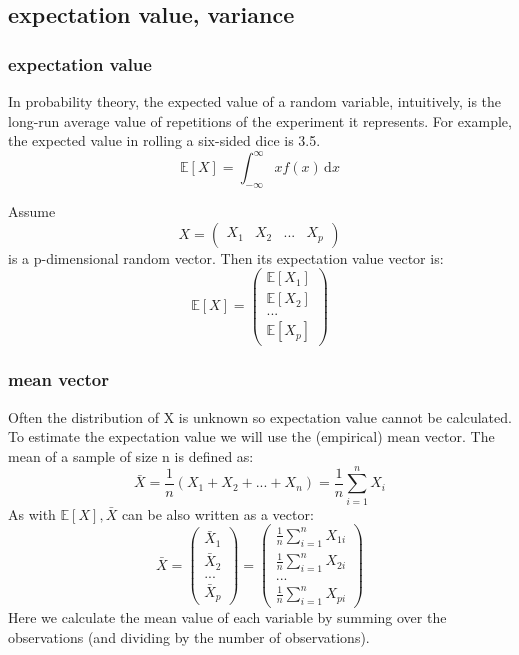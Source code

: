 \documentclass{beamer}
\begin{document}
\subsection{expectation value, variance}

\begin{frame}
\frametitle{expectation value}
In probability theory, the expected value of a random variable, intuitively, is the long-run average value of repetitions of the experiment it represents. 
\newline
For example, the expected value in rolling a six-sided dice is 3.5.
\newline
$$
\mathbb{E}[X] = \int_{-\infty}^{\infty} \! x f(x) \, \mathrm{d}x
$$

Assume $$X= 
\begin{pmatrix}
X_{1} & X_{2} & ... & X_{p}
\end{pmatrix}
$$
is a p-dimensional random vector. 
\newline 
Then its expectation value vector is:
$$
\mathbb{E}[X] =
\begin{pmatrix}
\mathbb{E}[X_{1}] \\
\mathbb{E}[X_{2}]\\
... \\
\mathbb{E}[X_{p}]
\end{pmatrix}
$$
\end{frame}



\begin{frame}
\frametitle{mean vector}
Often the distribution of X is unknown so expectation value cannot be calculated. To estimate the expectation value we will use the (empirical) mean vector.
\newline
The mean of a sample of size n is defined as:
$$
\bar{X} = \frac{1}{n} (X_1 +X_2 + ...+X_n) =  \frac{1}{n} \sum_{i = 1}^{n}X_i
$$
\newline 
As with $\mathbb{E}[X], \bar{X}$ can be also written as a vector: 
$$
\bar{X} =
\begin{pmatrix}
\bar{X}_{1} \\
\bar{X}_{2}\\
... \\
\bar{X}_{p}
\end{pmatrix}
= 
\begin{pmatrix}
 \frac{1}{n} \sum_{i = 1}^{n}X_{1i} \\
 \frac{1}{n} \sum_{i = 1}^{n}X_{2i} \\
... \\
 \frac{1}{n} \sum_{i = 1}^{n}X_{pi} 
\end{pmatrix}
$$
Here we calculate the mean value of each variable by summing over the observations (and dividing by the number of observations).



\end{frame}
\end{document}
